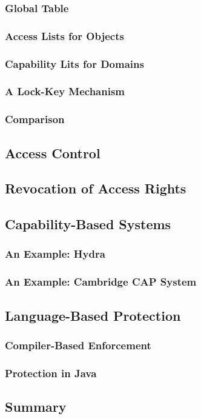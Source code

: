 \subsubsection{Global Table}
\subsubsection{Access Lists for Objects}
\subsubsection{Capability Lits for Domains}
\subsubsection{A Lock-Key Mechanism}
\subsubsection{Comparison}

\subsection{Access Control}


\subsection{Revocation of Access Rights}

\subsection{Capability-Based Systems}
\subsubsection{An Example: Hydra}
\subsubsection{An Example: Cambridge CAP System}

\subsection{Language-Based Protection}
\subsubsection{Compiler-Based Enforcement}
\subsubsection{Protection in Java}

\subsection{Summary}
